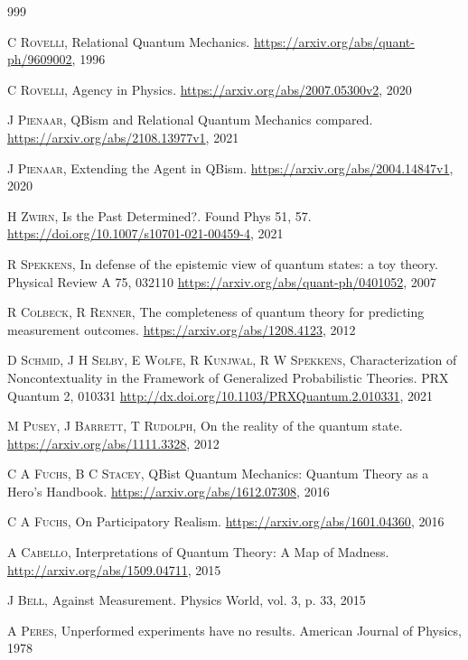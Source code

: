 \documentclass[11pt]{report}
\renewenvironment{thebibliography}[1]{\begin{oldthebibliography}{#1}\setlength{\itemsep}{0.45em}\setlength{\parskip}{0em}}{\end{oldthebibliography}}
\begin{document}
\begin{thebibliography}{999}
\begin{small}
		\textsc{C Rovelli,}
		{Relational Quantum Mechanics}.
		\url{https://arxiv.org/abs/quant-ph/9609002}, 1996
		
		\textsc{C Rovelli,}
		{Agency in Physics}.
		\url{https://arxiv.org/abs/2007.05300v2}, 2020
		
		\textsc{J Pienaar,}
		{QBism and Relational Quantum Mechanics compared}.
		\url{https://arxiv.org/abs/2108.13977v1}, 2021
		
		\textsc{J Pienaar,}
		{Extending the Agent in QBism}.
		\url{https://arxiv.org/abs/2004.14847v1}, 2020
		
		\textsc{H Zwirn,}
		{Is the Past Determined?}.
		Found Phys 51, 57. \url{https://doi.org/10.1007/s10701-021-00459-4}, 2021
		
		\textsc{R Spekkens,}
		{In defense of the epistemic view of quantum states: a toy theory}.
		Physical Review A 75, 032110 \url{https://arxiv.org/abs/quant-ph/0401052}, 2007
		
		\textsc{R Colbeck, R Renner,}
		{The completeness of quantum theory for predicting measurement outcomes}.
		\url{https://arxiv.org/abs/1208.4123}, 2012
		
		\textsc{D Schmid, J H Selby, E Wolfe, R Kunjwal, R W Spekkens,}
		{Characterization of Noncontextuality in the Framework of Generalized Probabilistic Theories}.
		PRX Quantum 2, 010331 \url{http://dx.doi.org/10.1103/PRXQuantum.2.010331}, 2021
		
		\textsc{M Pusey, J Barrett, T Rudolph,}
		{On the reality of the quantum state}.
		{\url{https://arxiv.org/abs/1111.3328}}, 2012
		
		
		\textsc{C A Fuchs, B C Stacey},
		{QBist Quantum Mechanics: Quantum Theory as a Hero’s Handbook}.
		{\url{https://arxiv.org/abs/1612.07308}}, 2016
		
		\textsc{C A Fuchs,}
		{On Participatory Realism}.
		{\url{https://arxiv.org/abs/1601.04360}}, 2016
		
		\textsc{A Cabello,}
		{Interpretations of Quantum Theory: A Map of Madness}.
		{\url{http://arxiv.org/abs/1509.04711}}, 2015
		
		\textsc{J Bell,}
		{Against Measurement}.
		Physics World, vol. 3, p. 33, 2015
		
		
		\textsc{A Peres,}
		{Unperformed experiments have no results}.
		American Journal of Physics, 1978
		

\end{small}
\end{thebibliography}
\end{document}
